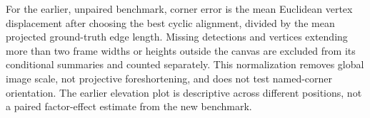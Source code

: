 For the earlier, unpaired benchmark, corner error is the mean Euclidean vertex
displacement after choosing the best cyclic alignment, divided by the mean
projected ground-truth edge length. Missing detections and vertices extending
more than two frame widths or heights outside the canvas are excluded from its
conditional summaries and counted separately. This normalization removes global
image scale, not projective foreshortening, and does not test named-corner
orientation. The earlier elevation plot is descriptive across different positions,
not a paired factor-effect estimate from the new benchmark.
